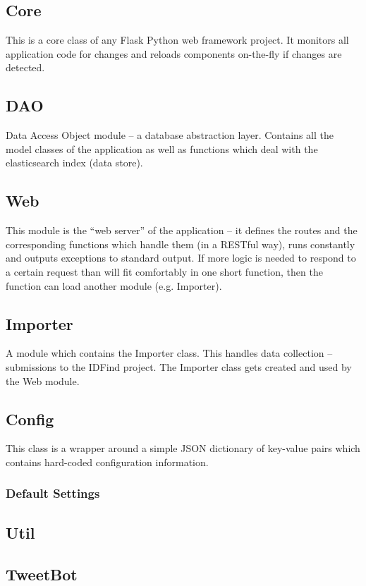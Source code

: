 \subsection{Core}
This is a core class of any Flask Python web framework project. It monitors all application code for changes and reloads components on-the-fly if changes are detected.

\subsection{DAO}
Data Access Object module – a database abstraction layer. Contains all the model classes of the application as well as functions which deal with the elasticsearch index (data store).

\subsection{Web}
This module is the ``web server'' of the application – it defines the routes and the corresponding functions which handle them (in a RESTful way), runs constantly and outputs exceptions to standard output. If more logic is needed to respond to a certain request than will fit comfortably in one short function, then the function can load another module (e.g. Importer).

\subsection{Importer}
A module which contains the Importer class. This handles data collection – submissions to the IDFind project. The Importer class gets created and used by the Web module.

\subsection{Config}
This class is a wrapper around a simple JSON dictionary of key-value pairs which contains hard-coded configuration information.

\subsubsection{Default Settings}

\subsection{Util}

\subsection{TweetBot}

